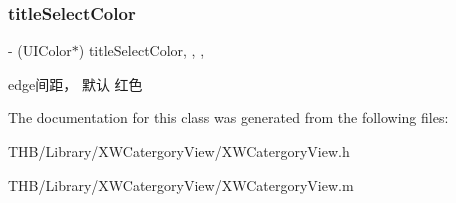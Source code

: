 \subsubsection{\texorpdfstring{title\+Select\+Color}{titleSelectColor}}
{\footnotesize\ttfamily -\/ (U\+I\+Color$\ast$) title\+Select\+Color\hspace{0.3cm}{\ttfamily [read]}, {\ttfamily [write]}, {\ttfamily [nonatomic]}, {\ttfamily [strong]}}

edge间距， 默认 红色 

The documentation for this class was generated from the following files\+:\begin{DoxyCompactItemize}
\item 
T\+H\+B/\+Library/\+X\+W\+Catergory\+View/X\+W\+Catergory\+View.\+h\item 
T\+H\+B/\+Library/\+X\+W\+Catergory\+View/X\+W\+Catergory\+View.\+m\end{DoxyCompactItemize}
